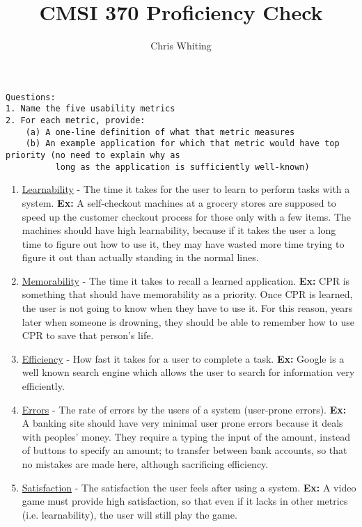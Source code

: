 \documentclass[11pt]{article}
\title{CMSI 370 Proficiency Check}
\author{Chris Whiting}
\begin{document}
\maketitle

 
\begin{verbatim}
Questions:
1. Name the five usability metrics
2. For each metric, provide:
	(a) A one-line definition of what that metric measures
	(b) An example application for which that metric would have top priority (no need to explain why as 
	      long as the application is sufficiently well-known)
\end{verbatim}

\begin{enumerate}
\item \underline{Learnability} - The time it takes for the user to learn to perform tasks with a system.
\textbf{Ex:} A self-checkout machines at a grocery stores are supposed to speed up the customer checkout process for those only with a few items. The machines should have high learnability, because if it takes the user a long time to figure out how to use it, they may have wasted more time trying to figure it out than actually standing in the normal lines. 
\item\underline{Memorability} - The time it takes to recall a learned application. 
\textbf{Ex:} CPR is something that should have memorability as a priority. Once CPR is learned, the user is not going to know when they have to use it. For this reason, years later when someone is drowning, they should be able to remember how to use CPR to save that person's life.
\item \underline{Efficiency} - How fast it takes for a user to complete a task.
\textbf{Ex:} Google is a well known search engine which allows the user to search for information very efficiently.
\item \underline{Errors} - The rate of errors by the users of a system (user-prone errors).
\textbf{Ex: } A banking site should have very minimal user prone errors because it deals with peoples' money. They require a typing the input of the amount, instead of buttons to specify an amount; to transfer between bank accounts, so that no mistakes are made here, although sacrificing efficiency.
\item\underline{Satisfaction} - The satisfaction the user feels after using a system.
\textbf{Ex:} A video game must provide high satisfaction, so that even if it lacks in other metrics (i.e. learnability), the user will still play the game.
\end{enumerate}

\end{document}
